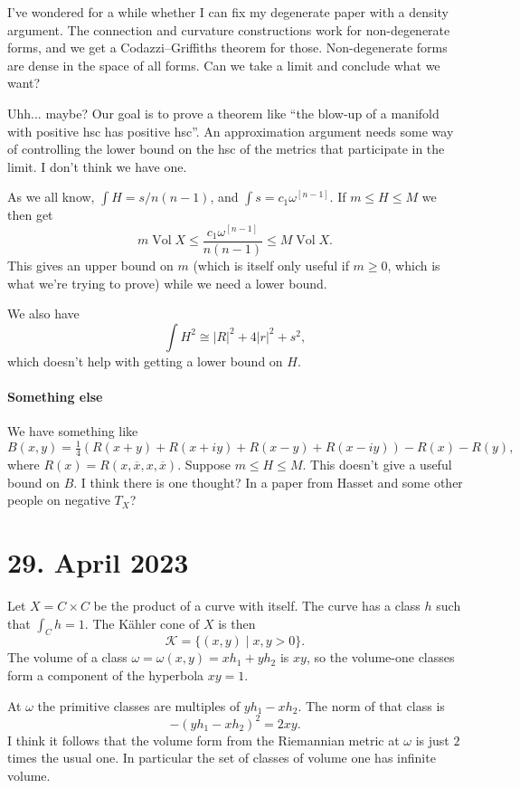 \documentclass[11pt]{amsart}
\theoremstyle{definition}
\newcommand{\cc}[1]{\mathcal{#1}}
\def\^#1{^{[#1]}}
\def\ov#1{\overline{#1}}
\DeclareMathOperator{\Vol}{Vol}
\begin{document}
I've wondered for a while whether I can fix my degenerate paper with a density
argument.
The connection and curvature constructions work for non-degenerate forms, and
we get a Codazzi--Griffiths theorem for those.
Non-degenerate forms are dense in the space of all forms.
Can we take a limit and conclude what we want?

Uhh... maybe?
Our goal is to prove a theorem like ``the blow-up of a manifold with positive
hsc has positive hsc''.
An approximation argument needs some way of controlling the lower bound on the hsc of the metrics that participate in the limit.
I don't think we have one.

As we all know, $\int H = s/n(n-1)$, and $\int s = c_1 \omega\^{n-1}$.
If $m \leq H \leq M$ we then get
$$
m \Vol X \leq \frac{c_1 \omega\^{n-1}}{n(n-1)} \leq M \Vol X.
$$
This gives an upper bound on $m$ (which is itself only useful if $m \geq 0$,
which is what we're trying to prove) while we need a lower bound.

We also have
$$
\int H^2 \cong |R|^2 + 4|r|^2 + s^2,
$$
which doesn't help with getting a lower bound on $H$.



\paragraph{Something else}

We have something like
$$
B(x,y)
= \tfrac14(R(x + y) + R(x + iy) + R(x - y) + R(x - iy))
- R(x) - R(y),
$$
where $R(x) = R(x, \ov x, x, \ov x)$.
Suppose $m \leq H \leq M$.
This doesn't give a useful bound on $B$.
I think there is one thought? In a paper from Hasset and some other people on negative $T_X$?



\section{29. April 2023}

Let $X = C \times C$ be the product of a curve with itself.
The curve has a class $h$ such that $\int_C h = 1$.
The K\"ahler cone of $X$ is then
$$
\cc K
= \{ (x,y) \mid x, y > 0 \}.
$$
The volume of a class $\omega = \omega(x,y) = x h_1 + y h_2$ is $xy$,
so the volume-one classes form a component of the hyperbola $xy = 1$.

At $\omega$ the primitive classes are multiples of $yh_1 - xh_2$.
The norm of that class is
$$
- (yh_1 - xh_2)^2 = 2xy.
$$
I think it follows that the volume form from the Riemannian metric at $\omega$
is just $2$ times the usual one.
In particular the set of classes of volume one has infinite volume.
\end{document}
